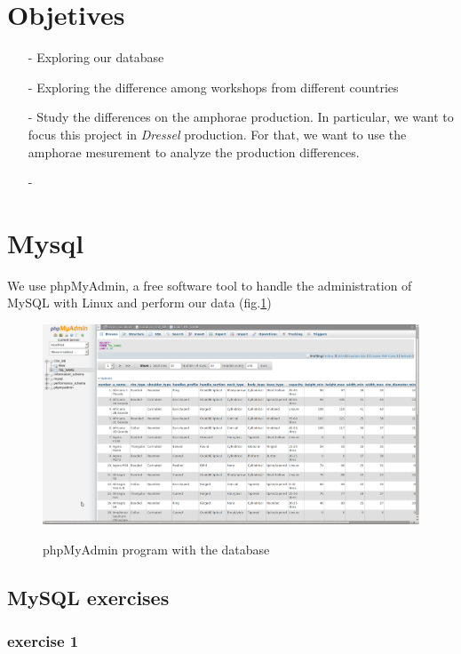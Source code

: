 \documentclass[10pt,a4paper]{article}
\begin{document}
\section{Objetives}

\begin{itemize}
\item[-] Exploring our database 
\item[-] Exploring the difference among workshops from different countries
\item[-] Study the differences on the amphorae production. In particular, we want to focus this project in \textit{Dressel} production. For that, we want to use the amphorae mesurement to analyze the production differences. 
\item[-] 
\end{itemize}


\section{Mysql}

We use phpMyAdmin, a free software tool to handle the administration of MySQL  with Linux and perform our data (fig.\ref{myphp})

\begin{figure}[hdp]
	\centering
\includegraphics[scale=0.25]{picture2.png}
\label{myphp}
\caption{phpMyAdmin program with the database}
\end{figure} 

\subsection{MySQL exercises}

\subsubsection{exercise 1}
\end{document}
